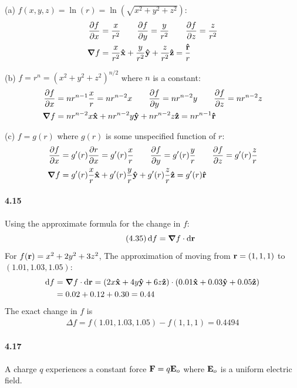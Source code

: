 \documentclass[../problems.tex]{subfiles}
\begin{document}
(a) $f(x,y,z) = \ln(r) = \ln(\sqrt{x^2 + y^2 + z^2})$:
\begin{align*}
    \pdv{f}{x} &= \frac{x}{r^2} \qquad \pdv{f}{y} = \frac{y}{r^2}
        \qquad \pdv{f}{z} = \frac{z}{r^2} \\
    \grad{f} &= \frac{x}{r^2} \vu{x} + \frac{y}{r^2} \vu{y} + \frac{z}{r^2} \vu{z} 
    = \frac{\vu{r}}{r}
\end{align*}

(b) $f = r^n = (x^2 + y^2 + z^2)^{n/2}$ where $n$ is a constant:
\begin{align*}
    \pdv{f}{x} &= nr^{n-1} \frac{x}{r} = nr^{n-2} x \qquad \pdv{f}{y} = nr^{n-2} y
        \qquad \pdv{f}{z} = nr^{n-2} z \\
    \grad{f} &= nr^{n-2} x \vu{x} + nr^{n-2} y \vu{y} + nr^{n-2} z \vu{z} = nr^{n-1} \vu{r}
\end{align*}

(c) $f = g(r)$ where $g(r)$ is some unspecified function of $r$:
\begin{align*}
    \pdv{f}{x} &= g'(r) \pdv{r}{x} = g'(r) \frac{x}{r} \qquad 
    \pdv{f}{y} = g'(r) \frac{y}{r} \qquad \pdv{f}{z} = g'(r) \frac{z}{r} \\
    \grad{f} &= g'(r) \frac{x}{r} \vu{x} + g'(r) \frac{y}{r} \vu{y} + g'(r) \frac{z}{r} \vu{z}
    = g'(r) \vu{r}
\end{align*}

\paragraph{4.15}
Using the approximate formula for the change in $f$:
\begin{equation*} \tag{4.35}
    \dd{f} = \grad{f} \cdot \dd{\vb{r}}
\end{equation*}
For $f(\vb{r}) = x^2 + 2y^2 + 3z^2$, The approximation of moving from $\vb{r} = (1, 1, 1)$ to
$(1.01, 1.03, 1.05)$:
\begin{align*}
    \dd{f} &= \grad{f} \cdot \dd{\vb{r}} = (2x \vu{x} + 4y \vu{y} + 6z \vu{z}) \cdot 
    (0.01 \vu{x} + 0.03 \vu{y} + 0.05 \vu{z}) \\
    &= 0.02 + 0.12 + 0.30 = 0.44
\end{align*}
The exact change in $f$ is
\begin{align*}
    \Delta f = f(1.01, 1.03, 1.05) - f(1, 1, 1) = 0.4494
\end{align*}

\paragraph{4.17}
A charge $q$ experiences a constant force $\vb{F} = q \vb{E}_o$ where $\vb{E}_o$ is a uniform
electric field. 
\end{document}
